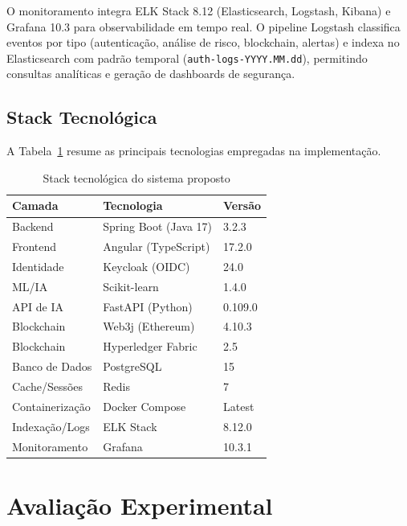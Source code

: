 \documentclass[12pt]{article}
\begin{document}
O monitoramento integra ELK Stack 8.12 (Elasticsearch, Logstash, Kibana) e Grafana 10.3 para observabilidade em tempo real. O pipeline Logstash classifica eventos por tipo (autenticação, análise de risco, blockchain, alertas) e indexa no Elasticsearch com padrão temporal (\texttt{auth-logs-YYYY.MM.dd}), permitindo consultas analíticas e geração de dashboards de segurança.

\subsection{Stack Tecnológica}

A Tabela~\ref{tab:tech_stack} resume as principais tecnologias empregadas na implementação.

\begin{table}[H]
\centering
\caption{Stack tecnológica do sistema proposto}
\label{tab:tech_stack}
\small
\begin{tabular}{@{}lll@{}}
\toprule
\textbf{Camada} & \textbf{Tecnologia} & \textbf{Versão} \\
\midrule
Backend           & Spring Boot (Java 17) & 3.2.3 \\
Frontend          & Angular (TypeScript)  & 17.2.0 \\
Identidade        & Keycloak (OIDC)       & 24.0 \\
ML/IA             & Scikit-learn          & 1.4.0 \\
API de IA         & FastAPI (Python)      & 0.109.0 \\
Blockchain        & Web3j (Ethereum)      & 4.10.3 \\
Blockchain        & Hyperledger Fabric    & 2.5 \\
Banco de Dados    & PostgreSQL            & 15 \\
Cache/Sessões     & Redis                 & 7 \\
Containerização   & Docker Compose        & Latest \\
Indexação/Logs     & ELK Stack            & 8.12.0 \\
Monitoramento     & Grafana               & 10.3.1 \\
\bottomrule
\end{tabular}
\end{table}

\section{Avaliação Experimental}
\end{document}
